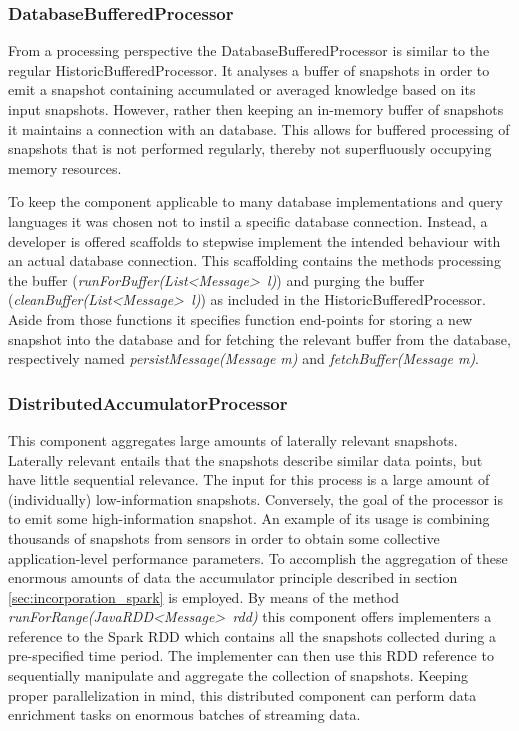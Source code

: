 \subsubsection{DatabaseBufferedProcessor}
From a processing perspective the DatabaseBufferedProcessor is similar to the regular HistoricBufferedProcessor. It analyses a buffer of snapshots in order to emit a snapshot containing accumulated or averaged knowledge based on its input snapshots. However, rather then keeping an in-memory buffer of snapshots it maintains a connection with an database. This allows for buffered processing of snapshots that is not performed regularly, thereby not superfluously occupying memory resources.

To keep the component applicable to many database implementations and query languages it was chosen not to instil a specific database connection. Instead, a developer is offered scaffolds to stepwise implement the intended behaviour with an actual  database connection. This scaffolding contains the methods processing the buffer (\emph{runForBuffer(List\textless Message\textgreater\ l)}) and purging the buffer (\emph{cleanBuffer(List\textless Message\textgreater\ l)}) as included in the HistoricBufferedProcessor. Aside from those functions it specifies function end-points for storing a new snapshot into the database and for fetching the relevant buffer from the database, respectively named \emph{persistMessage(Message m)} and \emph{fetchBuffer(Message m)}.	

\subsubsection{DistributedAccumulatorProcessor}
This component aggregates large amounts of laterally relevant snapshots. Laterally relevant entails that the snapshots describe similar data points, but have little sequential relevance. The input for this process is a large amount of (individually) low-information snapshots. Conversely, the goal of the processor is to emit some high-information snapshot. An example of its usage is combining thousands of snapshots from sensors in order to obtain some collective application-level performance parameters. To accomplish the aggregation of these enormous amounts of data the accumulator principle described in section \ref{sec:incorporation_spark} is employed. By means of the method \emph{runForRange(JavaRDD\textless Message\textgreater\ rdd)} this component offers implementers a reference to the Spark RDD which contains all the snapshots collected during a pre-specified time period. The implementer can then use this RDD reference to sequentially manipulate and aggregate the collection of snapshots. Keeping proper parallelization in mind, this distributed component can perform data enrichment tasks on enormous batches of streaming data.

